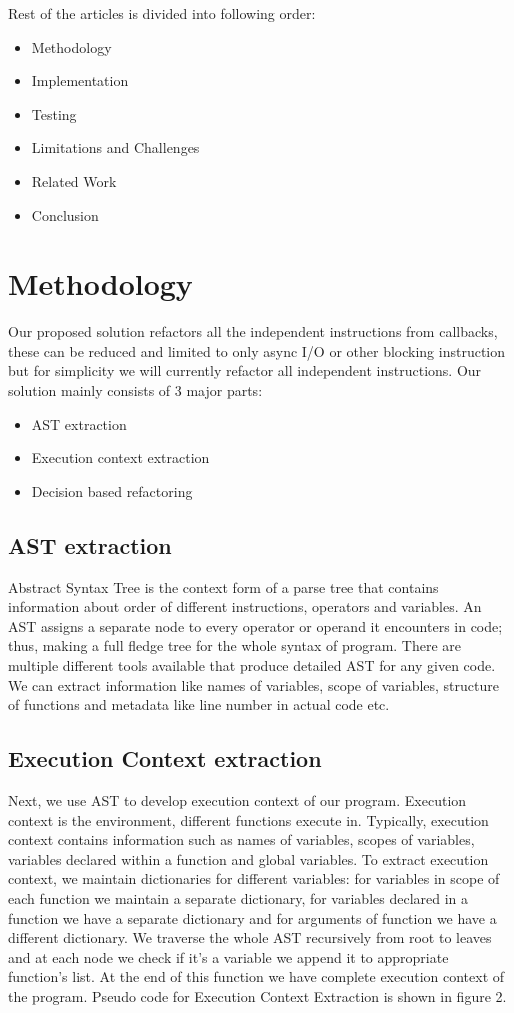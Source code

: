 \documentclass[10pt,conference]{IEEEtran}
\begin{document}
Rest of the articles is divided into following order:
\begin{itemize}
	\item Methodology
	\item Implementation
	\item Testing
	\item Limitations and Challenges
	\item Related Work
	\item Conclusion

\end{itemize}

\section{Methodology}
Our proposed solution refactors all the independent instructions from callbacks, these can be reduced and limited to only async I/O or other blocking instruction but for simplicity we will currently refactor all independent instructions. Our solution mainly consists of 3 major parts:
\begin{itemize}
	\item AST extraction
	\item Execution context extraction
	\item Decision based refactoring
\end{itemize}
\subsection{AST extraction}
Abstract Syntax Tree is the context form of a parse tree that contains information about order of different instructions, operators and variables. An AST assigns a separate node to every operator or operand it encounters in code; thus, making a full fledge tree for the whole syntax of program. There are multiple different tools available that produce detailed AST for any given code. We can extract information like names of variables, scope of variables, structure of functions and metadata like line number in actual code etc. 

\subsection{Execution Context extraction}
Next, we use AST to develop execution context of our program. Execution context is the environment, different functions execute in. Typically, execution context contains information such as names of variables, scopes of variables, variables declared within a function and global variables. To extract execution context, we maintain dictionaries for different variables: for variables in scope of each function we maintain a separate dictionary, for variables declared in a function we have a separate dictionary and for arguments of function we have a different dictionary. We traverse the whole AST recursively from root to leaves and at each node we check if it’s a variable we append it to appropriate function’s list. At the end of this function we have complete execution context of the program. Pseudo code for Execution Context Extraction is shown in figure 2.
\end{document}

